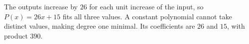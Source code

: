 The outputs increase by $26$ for each unit increase of the input, so $P(x)=26x+15$ fits all three values. A constant polynomial cannot take distinct values, making degree one minimal. Its coefficients are $26$ and $15$, with product $\boxed{390}$.
